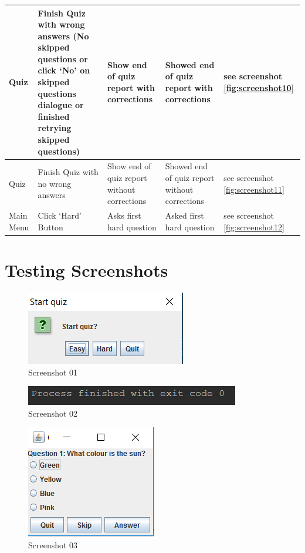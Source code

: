 \documentclass{report}
\begin{document}
\begin{longtable}[c]{|p{}|p{}|p{}|p{}|p{}|}
        \hline
        Quiz & Finish Quiz with wrong answers (No skipped questions or click `No' on skipped questions dialogue or finished retrying skipped questions) & Show end of quiz report with corrections & Showed end of quiz report with corrections & see screenshot \ref{fig:screenshot10}\\
        \hline
        Quiz & Finish Quiz with no wrong answers & Show end of quiz report without corrections & Showed end of quiz report without corrections & see screenshot \ref{fig:screenshot11}\\
        \hline
        Main Menu & Click `Hard' Button & Asks first hard question & Asked first hard question & see screenshot \ref{fig:screenshot12}\\
        \hline
    \end{longtable}
    
    \chapter{Testing Screenshots}
    
    \begin{figure}[H]
        \centering
        \includegraphics{Screenshot01}
        \caption{Screenshot 01}
        \label{fig:screenshot01}
    \end{figure}
    
    \begin{figure}
        \centering
        \includegraphics{Screenshot02}
        \caption{Screenshot 02}
        \label{fig:screenshot02}
    \end{figure}
    
    \begin{figure}
        \centering
        \includegraphics{Screenshot03}
        \caption{Screenshot 03}
        \label{fig:screenshot03}
    \end{figure}
    
\end{document}
